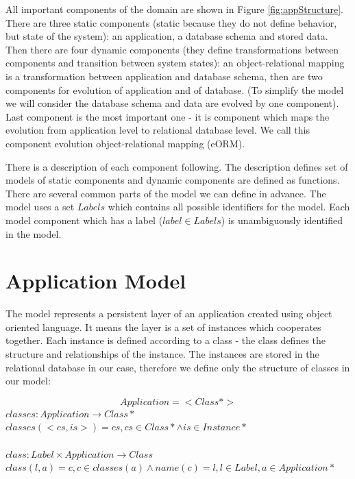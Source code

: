 \documentclass[11pt]{article}
\begin{document}
All important components of the domain are shown in Figure \ref{fig:appStructure}. There are three static components (static because they do not define behavior, but state of the system): an application, a database schema and stored data. Then there are four dynamic components (they define transformations between components and transition between system states): an object-relational mapping is a transformation between application and database schema, then are two components for evolution of application and of database. (To simplify the model we will consider the database schema and data are evolved by one component). Last component is the most important one - it is component which maps the evolution from application level to relational database level. We call this component evolution object-relational mapping (eORM).


There is a description of each component following. The description defines set of models of static components and dynamic components are defined as functions. There are several common parts of the model we can define in advance. The model uses a set $Labels$ which contains all possible identifiers for the model. Each model component which has a label ($label \in Labels$) is unambiguously identified in the model.





\section{Application Model}
The model represents a persistent layer of an application created using object oriented language. It means the layer is a set of instances which cooperates together. Each instance is defined according to a class - the class defines the structure and relationships of the instance. The instances are stored in the relational database in our case, therefore we define only the structure of classes in our model:
 
$$
Application = <Class*>
$$
$classes : Application \rightarrow Class*$ \\
$classes(<cs, is>) = cs, cs \in Class* \wedge is \in Instance* $ \\ \\
$class : Label \times Application \rightarrow Class  $ \\ 
$class(l, a) = c, c \in classes(a) \wedge name(c) = l, l \in Label, a \in Application* $ \\
\end{document}
